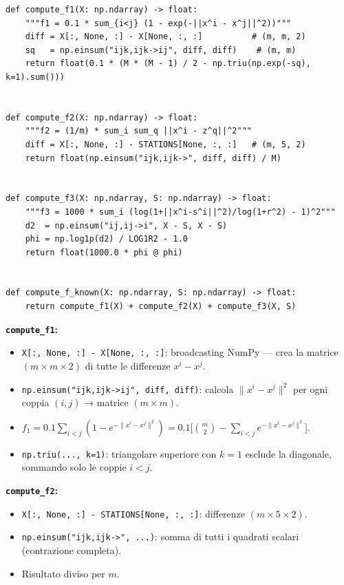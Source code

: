 \documentclass[12pt,a4paper]{article}
\theoremstyle{definition}
\begin{document}
\begin{lstlisting}[caption={Righe 132–153 — $f_1$, $f_2$, $f_3$ e loro somma}]
def compute_f1(X: np.ndarray) -> float:
    """f1 = 0.1 * sum_{i<j} (1 - exp(-||x^i - x^j||^2))"""
    diff = X[:, None, :] - X[None, :, :]          # (m, m, 2)
    sq   = np.einsum("ijk,ijk->ij", diff, diff)    # (m, m)
    return float(0.1 * (M * (M - 1) / 2 - np.triu(np.exp(-sq), k=1).sum()))


def compute_f2(X: np.ndarray) -> float:
    """f2 = (1/m) * sum_i sum_q ||x^i - z^q||^2"""
    diff = X[:, None, :] - STATIONS[None, :, :]   # (m, 5, 2)
    return float(np.einsum("ijk,ijk->", diff, diff) / M)


def compute_f3(X: np.ndarray, S: np.ndarray) -> float:
    """f3 = 1000 * sum_i (log(1+||x^i-s^i||^2)/log(1+r^2) - 1)^2"""
    d2  = np.einsum("ij,ij->i", X - S, X - S)
    phi = np.log1p(d2) / LOG1R2 - 1.0
    return float(1000.0 * phi @ phi)


def compute_f_known(X: np.ndarray, S: np.ndarray) -> float:
    return compute_f1(X) + compute_f2(X) + compute_f3(X, S)
\end{lstlisting}

\textbf{\texttt{compute\_f1}:}
\begin{itemize}[nosep]
  \item \texttt{X[:, None, :] - X[None, :, :]}: broadcasting NumPy — crea la matrice $(m \times m \times 2)$ di tutte le differenze $x^i - x^j$.
  \item \texttt{np.einsum("ijk,ijk->ij", diff, diff)}: calcola $\|x^i - x^j\|^2$ per ogni coppia $(i,j)$ → matrice $(m \times m)$.
  \item $f_1 = 0.1 \sum_{i<j}(1-e^{-\|x^i-x^j\|^2}) = 0.1\bigl[\binom{m}{2} - \sum_{i<j} e^{-\|x^i-x^j\|^2}\bigr]$.
  \item \texttt{np.triu(..., k=1)}: triangolare superiore con $k=1$ esclude la diagonale, sommando solo le coppie $i < j$.
\end{itemize}

\textbf{\texttt{compute\_f2}:}
\begin{itemize}[nosep]
  \item \texttt{X[:, None, :] - STATIONS[None, :, :]}: differenze $(m \times 5 \times 2)$.
  \item \texttt{np.einsum("ijk,ijk->", ...)}: somma di tutti i quadrati scalari (contrazione completa).
  \item Risultato diviso per $m$.
\end{itemize}
\end{document}
